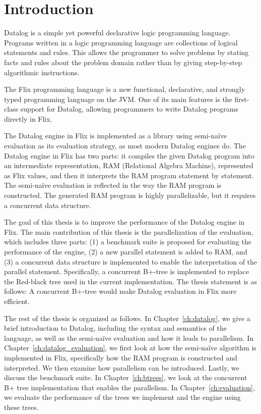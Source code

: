 \documentclass[twoside,11pt]{report}
\theoremstyle{definition}
\begin{document}
\chapter{Introduction}
\label{ch:intro}

Datalog is a simple yet powerful declarative logic programming language. Programs written in a logic programming language are collections of logical statements and rules. This allows the programmer to solve problems by stating facts and rules about the problem domain rather than by giving step-by-step algorithmic instructions.

The Flix programming language is a new functional, declarative, and strongly typed programming language on the JVM. One of its main features is the first-class support for Datalog, allowing programmers to write Datalog programs directly in Flix.

The Datalog engine in Flix is implemented as a library using semi-naïve evaluation as its evaluation strategy, as most modern Datalog engines do. The Datalog engine in Flix has two parts: it compiles the given Datalog program into an intermediate representation, RAM (Relational Algebra Machine), represented as Flix values, and then it interprets the RAM program statement by statement. The semi-naïve evaluation is reflected in the way the RAM program is constructed. The generated RAM program is highly parallelizable, but it requires a concurrent data structure.

The goal of this thesis is to improve the performance of the Datalog engine in Flix. The main contribution of this thesis is the parallelization of the evaluation, which includes three parts: (1) a benchmark suite is proposed for evaluating the performance of the engine, (2) a new parallel statement is added to RAM, and (3) a concurrent data structure is implemented to enable the interpretation of the parallel statement. Specifically, a concurrent B+-tree is implemented to replace the Red-black tree used in the current implementation. The thesis statement is as follows: A concurrent B+-tree would make Datalog evaluation in Flix more efficient.

The rest of the thesis is organized as follows. In Chapter~\ref{ch:datalog}, we give a brief introduction to Datalog, including the syntax and semantics of the language, as well as the semi-naïve evaluation and how it leads to parallelism. In Chapter~\ref{ch:datalog_evaluation}, we first look at how the semi-naïve algorithm is implemented in Flix, specifically how the RAM program is constructed and interpreted. We then examine how parallelism can be introduced. Lastly, we discuss the benchmark suite. In Chapter~\ref{ch:btrees}, we look at the concurrent B+ tree implementation that enables the parallelism. In Chapter~\ref{ch:evaluation}, we evaluate the performance of the trees we implement and the engine using these trees.
\end{document}
